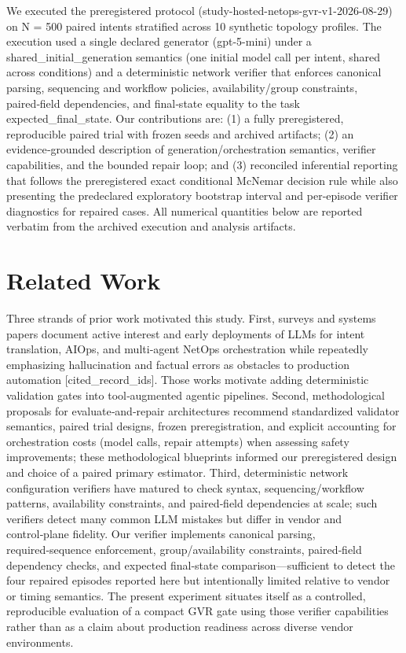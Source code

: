 \documentclass[conference]{IEEEtran}
\begin{document}
We executed the preregistered protocol (study-hosted-netops-gvr-v1-2026-08-29) on N = 500 paired intents stratified across 10 synthetic topology profiles. The execution used a single declared generator (gpt-5-mini) under a shared\_initial\_generation semantics (one initial model call per intent, shared across conditions) and a deterministic network verifier that enforces canonical parsing, sequencing and workflow policies, availability/group constraints, paired‑field dependencies, and final‑state equality to the task expected\_final\_state. Our contributions are: (1) a fully preregistered, reproducible paired trial with frozen seeds and archived artifacts; (2) an evidence‑grounded description of generation/orchestration semantics, verifier capabilities, and the bounded repair loop; and (3) reconciled inferential reporting that follows the preregistered exact conditional McNemar decision rule while also presenting the predeclared exploratory bootstrap interval and per‑episode verifier diagnostics for repaired cases. All numerical quantities below are reported verbatim from the archived execution and analysis artifacts.

\section{Related Work}
Three strands of prior work motivated this study. First, surveys and systems papers document active interest and early deployments of LLMs for intent translation, AIOps, and multi‑agent NetOps orchestration while repeatedly emphasizing hallucination and factual errors as obstacles to production automation [cited\_record\_ids]. Those works motivate adding deterministic validation gates into tool‑augmented agentic pipelines. Second, methodological proposals for evaluate‑and‑repair architectures recommend standardized validator semantics, paired trial designs, frozen preregistration, and explicit accounting for orchestration costs (model calls, repair attempts) when assessing safety improvements; these methodological blueprints informed our preregistered design and choice of a paired primary estimator. Third, deterministic network configuration verifiers have matured to check syntax, sequencing/workflow patterns, availability constraints, and paired‑field dependencies at scale; such verifiers detect many common LLM mistakes but differ in vendor and control‑plane fidelity. Our verifier implements canonical parsing, required‑sequence enforcement, group/availability constraints, paired‑field dependency checks, and expected final‑state comparison---sufficient to detect the four repaired episodes reported here but intentionally limited relative to vendor or timing semantics. The present experiment situates itself as a controlled, reproducible evaluation of a compact GVR gate using those verifier capabilities rather than as a claim about production readiness across diverse vendor environments.
\end{document}
